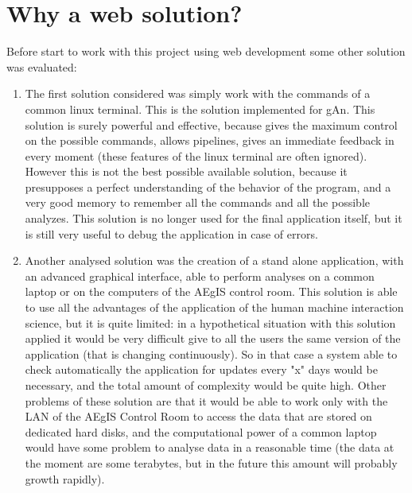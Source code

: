 \section{Why a web solution?}

Before start to work with this project using web development some other solution was evaluated:

\begin{enumerate}

\item 
The first solution considered was simply work with the commands of a common linux terminal. This is the solution implemented for gAn. This solution is surely powerful and effective, because gives the maximum control on the possible commands, allows pipelines, gives an immediate feedback in every moment (these features of the linux terminal are often ignored). However this is not the best possible available solution, because it presupposes a perfect understanding of the behavior of the program, and a very good memory to remember all the commands and all the possible analyzes. 
This solution is no longer used for the final application itself, but it is still very useful to debug the application in case of errors.   

\item
Another analysed solution was the creation of a stand alone application, with an advanced graphical interface, able to perform analyses on a common laptop or on the computers of the AEgIS control room. This solution is able to use all the advantages of the application of the human machine interaction science, but it is quite limited: in a hypothetical situation with this solution applied it would be very difficult give to all the users the same version of the application (that is changing continuously). So in that case a system able to check automatically the application for updates every "x" days would be necessary, and the total amount of complexity would be quite high. Other problems of these solution are that it would be able to work only with the LAN of the AEgIS Control Room to access the data that are stored on dedicated hard disks, and the computational power of a common laptop would have some problem to analyse data in a reasonable time (the data at the moment are some terabytes, but in the future this amount will probably growth rapidly).


\end{enumerate}
